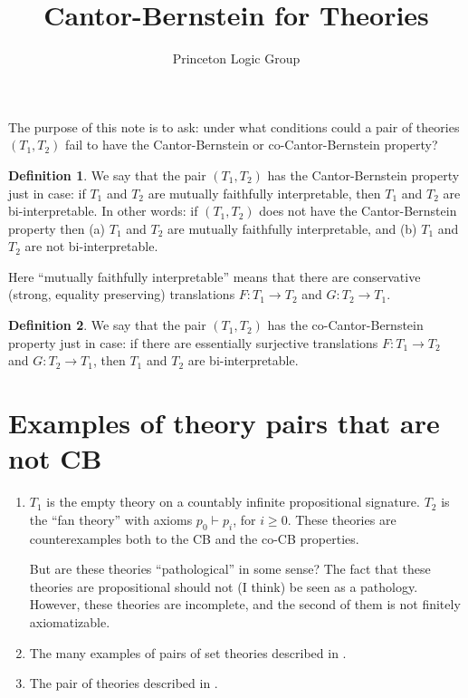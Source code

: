 \documentclass[12pt]{article}
\title{Cantor-Bernstein for Theories}
\author{Princeton Logic Group}
\theoremstyle{definition}
\newtheorem*{defn}{Definition}
\newcommand{\3}{\mathcal}
\begin{document}


\maketitle

The purpose of this note is to ask: under what conditions could a pair
of theories $(T_1,T_2)$ fail to have the Cantor-Bernstein or
co-Cantor-Bernstein property?

\begin{defn} We say that the pair $(T_1,T_2)$ has the Cantor-Bernstein
  property just in case: if $T_1$ and $T_2$ are mutually faithfully
  interpretable, then $T_1$ and $T_2$ are bi-interpretable. In other
  words: if $(T_1,T_2)$ does not have the Cantor-Bernstein property
  then (a) $T_1$ and $T_2$ are mutually faithfully interpretable, and
  (b) $T_1$ and $T_2$ are not bi-interpretable. \end{defn}

Here ``mutually faithfully interpretable'' means that there are
conservative (strong, equality preserving) translations $F:T_1\to T_2$
and $G:T_2\to T_1$.

\begin{defn} We say that the pair $(T_1,T_2)$ has the
  co-Cantor-Bernstein property just in case: if there are essentially
  surjective translations $F:T_1\to T_2$ and $G:T_2\to T_1$, then
  $T_1$ and $T_2$ are bi-interpretable. \end{defn}




\section{Examples of theory pairs that are not CB}


\begin{enumerate}
\item $T_1$ is the empty theory on a countably infinite propositional
  signature. $T_2$ is the ``fan theory'' with axioms $p_0\vdash p_i$,
  for $i\geq 0$. These theories are counterexamples both to the CB and
  the co-CB properties.

  But are these theories ``pathological'' in some sense? The fact that
  these theories are propositional should not (I think) be seen as a
  pathology. However, these theories are incomplete, and the second of
  them is not finitely axiomatizable.
\item The many examples of pairs of set theories described in \citep[p
  8]{hamkins}.
\item The pair of theories described in \citep{andreka}.
\end{enumerate}
\end{document}
